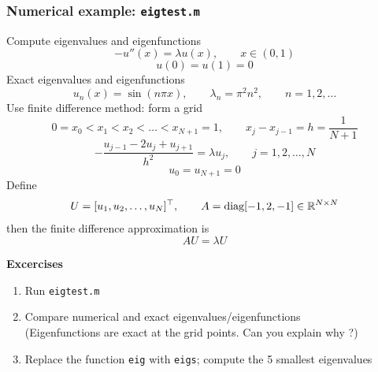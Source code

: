 \documentclass[11pt,xcolor=svgnames,onlymath]{beamer}
\begin{document}
\begin{frame}
\frametitle{Numerical example: {\tt eigtest.m}}
Compute eigenvalues and eigenfunctions
\[
-u''(x) = \lambda u(x), \qquad x \in (0,1)
\]
\[
u(0) = u(1) = 0
\]
Exact eigenvalues and eigenfunctions
\[
u_n(x) = \sin(n\pi x), \qquad \lambda_n = \pi^2 n^2, \qquad n=1,2,\ldots
\]
Use finite difference method: form a grid
\[
0 = x_0 < x_1 < x_2 < \ldots < x_{N+1} = 1, \qquad x_j - x_{j-1} = h = \frac{1}{N+1}
\]
\[
- \frac{u_{j-1} - 2 u_j + u_{j+1}}{h^2} = \lambda u_j, \qquad j=1,2,\ldots,N
\]
\[
u_0 = u_{N+1} = 0
\]
Define
\[
U = [u_1, u_2, \ldots, u_N]^\top, \qquad A = \mbox{diag}[-1, 2, -1] \in \mathbb{R}^{N \times N}
\]
then the finite difference approximation is
\[
AU = \lambda U
\]

{\bf Excercises}

\begin{enumerate}

\item Run {\tt eigtest.m}

\item Compare numerical and exact eigenvalues/eigenfunctions\\
(Eigenfunctions are exact at the grid points. Can you explain why ?)

\item Replace the function {\tt eig} with {\tt eigs}; compute the 5 smallest eigenvalues

\end{enumerate}

\end{frame}
\end{document}
